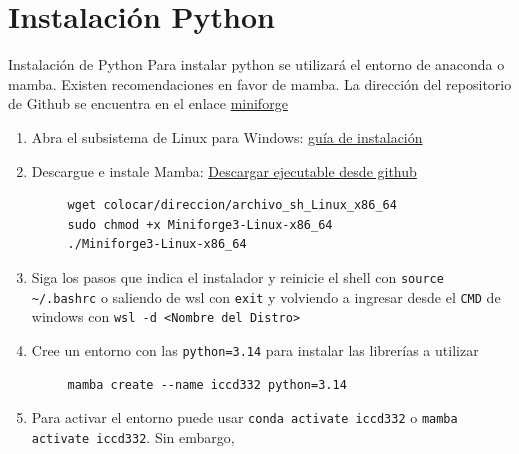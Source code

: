 \documentclass[presentation]{beamer}
\begin{document}
\section{Instalación Python}
\label{sec:org487af33}
\begin{frame}{Instalación de Python}
 Para instalar python se utilizará el entorno de anaconda o
mamba. Existen recomendaciones en favor de mamba. La dirección del
repositorio de Github se encuentra en el enlace \href{https://github.com/conda-forge/miniforge/}{miniforge}

\begin{enumerate}
\item Abra el subsistema  de Linux para Windows: \href{https://learn.microsoft.com/es-es/windows/wsl/install}{guía de instalación}

\item Descargue e instale Mamba: \href{https://github.com/conda-forge/miniforge/releases/latest/download/Miniforge3-Linux-x86\_64.sh}{Descargar ejecutable desde github}
\begin{verbatim}
     wget colocar/direccion/archivo_sh_Linux_x86_64
     sudo chmod +x Miniforge3-Linux-x86_64
     ./Miniforge3-Linux-x86_64
\end{verbatim}
\item Siga los pasos que indica el instalador y reinicie el shell con
\texttt{source \textasciitilde{}/.bashrc} o saliendo de wsl con \texttt{exit} y volviendo a
ingresar desde el \texttt{CMD} de windows con \texttt{wsl -d <Nombre del Distro>}
\item Cree un entorno con las \texttt{python=3.14} para instalar las librerías a utilizar
\begin{verbatim}
     mamba create --name iccd332 python=3.14
\end{verbatim}
\item Para activar el entorno puede usar \texttt{conda activate iccd332} o
\texttt{mamba activate iccd332}. Sin embargo,
\end{enumerate}
\end{frame}
\end{document}
